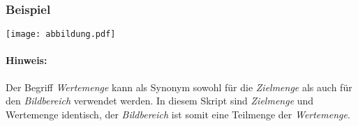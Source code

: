 \subsubsection*{Beispiel}
\texttt{[image: abbildung.pdf]}

\paragraph{Hinweis:}
Der Begriff \emph{Wertemenge} kann als Synonym sowohl für die \emph{Zielmenge}
als auch für den \emph{Bildbereich} verwendet werden. In diesem Skript sind
\emph{Zielmenge} und {Wertemenge} identisch, der \emph{Bildbereich} ist somit
eine Teilmenge der \emph{Wertemenge}.
